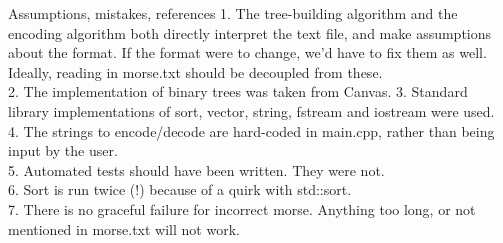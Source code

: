 \documentclass[10pt]{article}
\begin{document}
\begin{section}{Assumptions, mistakes, references}
  1. The tree-building algorithm and the encoding algorithm both directly interpret the text file, and make assumptions about the format. If the format were to change, we'd have to fix them as well. Ideally, reading in morse.txt should be decoupled from these.\\
  2. The implementation of binary trees was taken from Canvas.
  3. Standard library implementations of sort, vector, string, fstream and iostream were used.\\
  4. The strings to encode/decode are hard-coded in main.cpp, rather than being input by the user.\\
  5. Automated tests should have been written. They were not.\\
  6. Sort is run twice (!) because of a quirk with std::sort.\\
  7. There is no graceful failure for incorrect morse. Anything too long, or not mentioned in morse.txt will not work.\\
\end{section}
\end{document}
